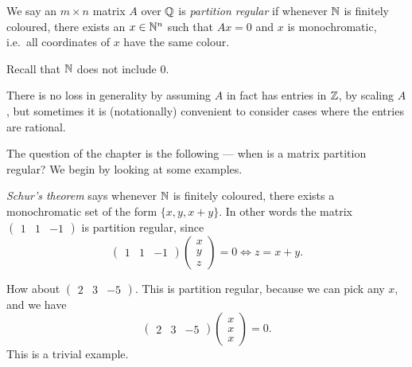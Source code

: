 \documentclass[a4paper]{article}
\begin{document}
  \begin{defi}
    We say an $m \times n$ matrix $A$ over $\mathbb{Q}$ is \emph{partition regular} if whenever $\mathbb{N}$ is finitely coloured, there exists an $x \in \mathbb{N}^n$ such that $Ax = 0$ and $x$ is monochromatic, i.e.\ all coordinates of $x$ have the same colour.
  \end{defi}
  Recall that $\mathbb{N}$ does not include $0$.

  There is no loss in generality by assuming $A$ in fact has entries in $\mathbb{Z}$, by scaling $A$, but sometimes it is (notationally) convenient to consider cases where the entries are rational.

  The question of the chapter is the following --- when is a matrix partition regular? We begin by looking at some examples.
  \begin{eg}
    \emph{Schur's theorem} says whenever $\mathbb{N}$ is finitely coloured, there exists a monochromatic set of the form $\{x, y, x + y\}$. In other words the matrix $\begin{pmatrix}1 & 1 & -1\end{pmatrix}$ is partition regular, since
    \[
      \begin{pmatrix}
        1 & 1 & -1
      \end{pmatrix}
      \begin{pmatrix}
        x\\y\\z
      \end{pmatrix} = 0 \Longleftrightarrow z = x + y.
    \]
  \end{eg}

  \begin{eg}
    How about $\begin{pmatrix}2 & 3 & -5\end{pmatrix}$. This is partition regular, because we can pick any $x$, and we have
    \[
      \begin{pmatrix}
        2 & 3 & -5
      \end{pmatrix}
      \begin{pmatrix}
        x\\x\\x
      \end{pmatrix} = 0.
    \]
    This is a trivial example.
  \end{eg}
\end{document}
